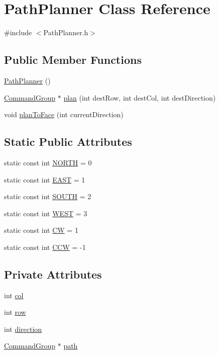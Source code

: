 \hypertarget{classPathPlanner}{\section{Path\-Planner Class Reference}
\label{classPathPlanner}
}


{\ttfamily \#include $<$Path\-Planner.\-h$>$}

\subsection*{Public Member Functions}
\begin{DoxyCompactItemize}
\item 
\hyperlink{classPathPlanner_a376f30d795cfe0a40f8923f49336f7da}{Path\-Planner} ()
\item 
\hyperlink{classCommandGroup}{Command\-Group} $\ast$ \hyperlink{classPathPlanner_acfae981cdde0b63b700bb1e2e9ffc1a6}{plan} (int dest\-Row, int dest\-Col, int dest\-Direction)
\item 
void \hyperlink{classPathPlanner_a435470288f6e2b5f99ce590db0bfc5db}{plan\-To\-Face} (int current\-Direction)
\end{DoxyCompactItemize}
\subsection*{Static Public Attributes}
\begin{DoxyCompactItemize}
\item 
static const int \hyperlink{classPathPlanner_a701384da34d065d821a936893c5ddd8d}{N\-O\-R\-T\-H} = 0
\item 
static const int \hyperlink{classPathPlanner_a45399b95a063acdff309e376ccac0fa2}{E\-A\-S\-T} = 1
\item 
static const int \hyperlink{classPathPlanner_a0d74731cd6e012a8724689f8c8f6492e}{S\-O\-U\-T\-H} = 2
\item 
static const int \hyperlink{classPathPlanner_aac8f18908f761050a3801acd476ea0ce}{W\-E\-S\-T} = 3
\item 
static const int \hyperlink{classPathPlanner_af08949a4cd572b26f4f37ff441191b3a}{C\-W} = 1
\item 
static const int \hyperlink{classPathPlanner_ab08a4cb0f762a4401a804bf0ce1bbbe6}{C\-C\-W} = -\/1
\end{DoxyCompactItemize}
\subsection*{Private Attributes}
\begin{DoxyCompactItemize}
\item 
int \hyperlink{classPathPlanner_a20d2bf800c63aacfd1af314ad400d119}{col}
\item 
int \hyperlink{classPathPlanner_a00b0fa8525a5fe9c8088ccaa005c4c54}{row}
\item 
int \hyperlink{classPathPlanner_a1f9985b79ca49ca0b2992176a10a6210}{direction}
\item 
\hyperlink{classCommandGroup}{Command\-Group} $\ast$ \hyperlink{classPathPlanner_a9b41e5ee68a78a45e46003102a6c3b91}{path}
\end{DoxyCompactItemize}


